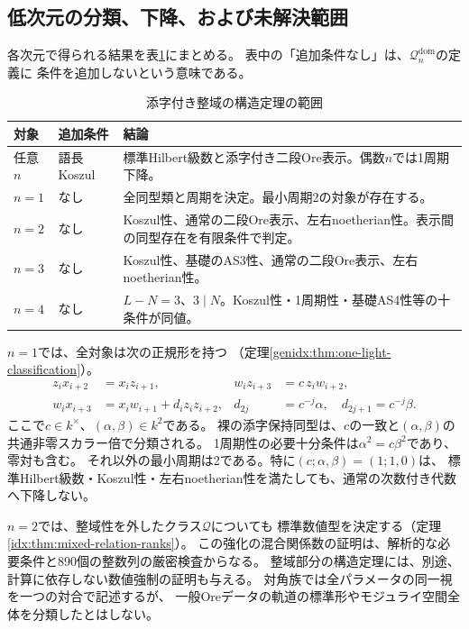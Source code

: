 \documentclass[11pt,a4paper]{ltjsarticle}
\theoremstyle{definition}
\begin{document}
\subsection{低次元の分類、下降、および未解決範囲}
各次元で得られる結果を表\ref{intro:tab:scope}にまとめる。
表中の「追加条件なし」は、$\mathcal Q_n^{\mathrm{dom}}$の定義に
条件を追加しないという意味である。
\begin{table}[htbp]
\centering\small
\caption{添字付き整域の構造定理の範囲}\label{intro:tab:scope}
\begin{tabular}{p{16mm}p{29mm}p{94mm}}
\toprule
対象 & 追加条件 & 結論\\
\midrule
任意$n$ & 語長Koszul & 標準Hilbert級数と添字付き二段Ore表示。偶数$n$では1周期下降。\\
$n=1$ & なし & 全同型類と周期を決定。最小周期2の対象が存在する。\\
$n=2$ & なし & Koszul性、通常の二段Ore表示、左右noetherian性。表示間の同型存在を有限条件で判定。\\
$n=3$ & なし & Koszul性、基礎のAS3性、通常の二段Ore表示、左右noetherian性。\\
$n=4$ & なし & $L-N=3$、$3\mid N$。Koszul性・1周期性・基礎AS4性等の十条件が同値。\\
\bottomrule
\end{tabular}
\end{table}

$n=1$では、全対象は次の正規形を持つ
（定理\ref{genidx:thm:one-light-classification}）。
\begin{align*}
 z_i x_{i+2}&=x_i z_{i+1},&
 w_i z_{i+3}&=c\,z_i w_{i+2},\\
 w_i x_{i+3}&=x_iw_{i+1}+d_i z_i z_{i+2},&
 d_{2j}&=c^{-j}\alpha,\quad d_{2j+1}=c^{-j}\beta.
\end{align*}
ここで$c\in k^\times$、$(\alpha,\beta)\in k^2$である。
裸の添字保持同型は、$c$の一致と$(\alpha,\beta)$の共通非零スカラー倍で分類される。
1周期性の必要十分条件は$\alpha^2=c\beta^2$であり、零対も含む。
それ以外の最小周期は2である。特に$(c;\alpha,\beta)=(1;1,0)$は、
標準Hilbert級数・Koszul性・左右noetherian性を満たしても、通常の次数付き代数へ下降しない。

$n=2$では、整域性を外したクラス$\mathcal Q$についても
標準数値型を決定する（定理\ref{idx:thm:mixed-relation-ranks}）。
この強化の混合関係数の証明は、解析的な必要条件と890個の整数列の厳密検査からなる。
整域部分の構造定理には、別途、計算に依存しない数値強制の証明も与える。
対角族では全パラメータの同一視を一つの対合で記述するが、
一般Oreデータの軌道の標準形やモジュライ空間全体を分類したとはしない。
\end{document}
